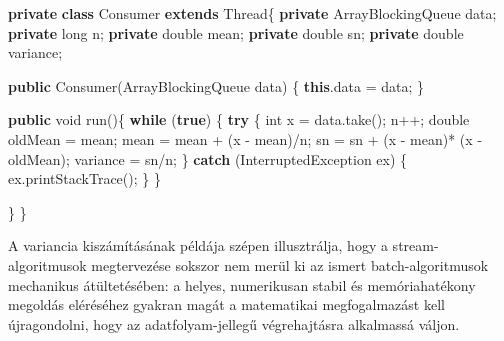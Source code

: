 \documentclass[
]{article}
\newenvironment{Shaded}{}{}
\newcommand{\BuiltInTok}[1]{\textcolor[rgb]{0.00,0.50,0.00}{#1}}
\newcommand{\ControlFlowTok}[1]{\textcolor[rgb]{0.00,0.44,0.13}{\textbf{#1}}}
\newcommand{\DataTypeTok}[1]{\textcolor[rgb]{0.56,0.13,0.00}{#1}}
\newcommand{\FunctionTok}[1]{\textcolor[rgb]{0.02,0.16,0.49}{#1}}
\newcommand{\KeywordTok}[1]{\textcolor[rgb]{0.00,0.44,0.13}{\textbf{#1}}}
\newcommand{\NormalTok}[1]{#1}
\newcommand{\OperatorTok}[1]{\textcolor[rgb]{0.40,0.40,0.40}{#1}}
\begin{document}
\begin{Shaded}
\begin{Highlighting}[]
\KeywordTok{private} \KeywordTok{class}\NormalTok{ Consumer }\KeywordTok{extends} \BuiltInTok{Thread}\OperatorTok{\{}
    \KeywordTok{private} \BuiltInTok{ArrayBlockingQueue}\NormalTok{ data}\OperatorTok{;}
    \KeywordTok{private} \DataTypeTok{long}\NormalTok{ n}\OperatorTok{;}
    \KeywordTok{private} \DataTypeTok{double}\NormalTok{ mean}\OperatorTok{;}
    \KeywordTok{private} \DataTypeTok{double}\NormalTok{ sn}\OperatorTok{;}
    \KeywordTok{private} \DataTypeTok{double}\NormalTok{ variance}\OperatorTok{;}

    \KeywordTok{public} \FunctionTok{Consumer}\OperatorTok{(}\BuiltInTok{ArrayBlockingQueue}\NormalTok{ data}\OperatorTok{)} \OperatorTok{\{}
        \KeywordTok{this}\OperatorTok{.}\FunctionTok{data} \OperatorTok{=}\NormalTok{ data}\OperatorTok{;}
    \OperatorTok{\}}

    \KeywordTok{public} \DataTypeTok{void} \FunctionTok{run}\OperatorTok{()\{}
        \ControlFlowTok{while} \OperatorTok{(}\KeywordTok{true}\OperatorTok{)} \OperatorTok{\{}
            \ControlFlowTok{try} \OperatorTok{\{}
                \DataTypeTok{int}\NormalTok{ x }\OperatorTok{=}\NormalTok{ data}\OperatorTok{.}\FunctionTok{take}\OperatorTok{();}
\NormalTok{                n}\OperatorTok{++;}
                \DataTypeTok{double}\NormalTok{ oldMean }\OperatorTok{=}\NormalTok{ mean}\OperatorTok{;}
\NormalTok{                mean }\OperatorTok{=}\NormalTok{ mean }\OperatorTok{+} \OperatorTok{(}\NormalTok{x }\OperatorTok{{-}}\NormalTok{ mean}\OperatorTok{)/}\NormalTok{n}\OperatorTok{;}
\NormalTok{                sn }\OperatorTok{=}\NormalTok{ sn }\OperatorTok{+} \OperatorTok{(}\NormalTok{x }\OperatorTok{{-}}\NormalTok{ mean}\OperatorTok{)*} \OperatorTok{(}\NormalTok{x }\OperatorTok{{-}}\NormalTok{ oldMean}\OperatorTok{);}
\NormalTok{                variance }\OperatorTok{=}\NormalTok{ sn}\OperatorTok{/}\NormalTok{n}\OperatorTok{;}
            \OperatorTok{\}} \ControlFlowTok{catch} \OperatorTok{(}\BuiltInTok{InterruptedException}\NormalTok{ ex}\OperatorTok{)} \OperatorTok{\{}
\NormalTok{                ex}\OperatorTok{.}\FunctionTok{printStackTrace}\OperatorTok{();}
            \OperatorTok{\}}
        \OperatorTok{\}}

    \OperatorTok{\}}
\OperatorTok{\}}
\end{Highlighting}
\end{Shaded}

A variancia kiszámításának példája szépen illusztrálja, hogy a
stream-algoritmusok megtervezése sokszor nem merül ki az ismert
batch-algoritmusok mechanikus átültetésében: a helyes, numerikusan
stabil és memóriahatékony megoldás eléréséhez gyakran magát a
matematikai megfogalmazást kell újragondolni, hogy az adatfolyam-jellegű
végrehajtásra alkalmassá váljon.
\end{document}
